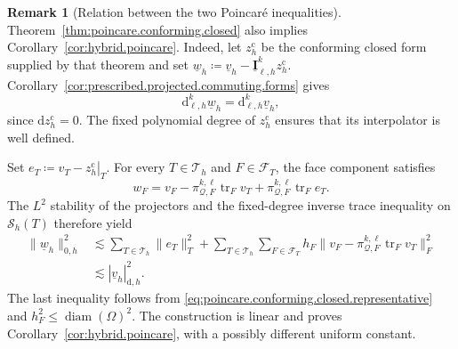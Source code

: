 \documentclass[a4paper,11pt]{article}
\theoremstyle{definition}
\newtheorem{remark}[theorem]{Remark}
\newcommand{\DIFF}{\mathrm{d}}
\newcommand{\Sh}{\mathcal{S}_h}
\newcommand{\uI}[2]{\underline{\boldsymbol{I}}_{\ell,#2}^{#1}}
\newcommand{\piQ}[2]{\pi_{\mathcal Q,#1}^{#2,\ell}}
\newcommand{\trc}{\operatorname{tr}}
\begin{document}
\begin{remark}[Relation between the two Poincar\'e inequalities]
\label{rem:poincare.closed.implies.hybrid}
Theorem~\ref{thm:poincare.conforming.closed} also implies Corollary~\ref{cor:hybrid.poincare}.
Indeed, let $z_h^{\mathrm c}$ be the conforming closed form supplied by that theorem and set
$\underline w_h\coloneqq\underline v_h-\uI{k}{h}z_h^{\mathrm c}$.
Corollary~\ref{cor:prescribed.projected.commuting.forms} gives
\[
  \DIFF_{\ell,h}^{k}\underline w_h
  =
  \DIFF_{\ell,h}^{k}\underline v_h,
\]
since $\DIFF z_h^{\mathrm c}=0$.
The fixed polynomial degree of $z_h^{\mathrm c}$ ensures that its interpolator is well defined.

Set $e_T\coloneqq v_T-\left.z_h^{\mathrm c}\right|_T$.
For every $T\in\mathcal T_h$ and $F\in\mathcal F_T$, the face component satisfies
\[
  w_F
  =
  v_F-\piQ{F}{k}\trc_Fv_T
  +
  \piQ{F}{k}\trc_Fe_T.
\]
The $L^2$ stability of the projectors and the fixed-degree inverse trace inequality on $\Sh(T)$ therefore yield
\[
\begin{aligned}
  \|\underline w_h\|_{0,h}^2
  &\lesssim
  \sum_{T\in\mathcal T_h}\|e_T\|_T^2
  +
  \sum_{T\in\mathcal T_h}
  \sum_{F\in\mathcal F_T}
  h_F\|v_F-\piQ{F}{k}\trc_Fv_T\|_F^2
  \\
  &\lesssim
  |\underline v_h|_{\DIFF,h}^2.
\end{aligned}
\]
The last inequality follows from
\eqref{eq:poincare.conforming.closed.representative}
and $h_F^2\leq\operatorname{diam}(\Omega)^2$.
The construction is linear and proves Corollary~\ref{cor:hybrid.poincare}, with a possibly different uniform constant.
\end{remark}
\end{document}
